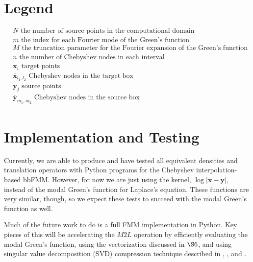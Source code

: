 \documentclass[11pt, oneside]{article}   	%
\begin{document}
\begin{appendices}
\section{Legend}
\begin{align*}
&N \mbox{ the number of source points in the computational domain}\\
&m \mbox{ the index for each Fourier mode of the Green's function}\\
&M \mbox{ the truncation parameter for the Fourier expansion of the Green's function}\\
&n \mbox{ the number of Chebyshev nodes in each interval}\\
&\mathbf{x}_i\mbox{ target points}\\
&\mathbf{\overline{x}}_{l_1,l_2}\mbox{ Chebyshev nodes in the target box}\\
&\mathbf{y}_j\mbox{ source points}\\
&\mathbf{\overline{y}}_{m_1,m_2}\mbox{ Chebyshev nodes in the source box}\\
\end{align*}


\section{Implementation and Testing}
Currently, we are able to produce and have tested all equivalent densities and translation operators with Python programs for the Chebyshev interpolation-based bbFMM. However, for now we are just using the kernel, $\log|\mathbf{x}-\mathbf{y}|$, instead of the modal Green's function for Laplace's equation. These functions are very similar, though, so we expect these tests to succeed with the modal Green's function as well.

Much of the future work to do is a full FMM implementation in Python. Key pieces of this will be accelerating the $M2L$ operation by efficiently evaluating the modal Green's function, using the vectorization discussed in $\S6$, and using singular value decomposition (SVD) compression technique described in \cite{CGMR}, \cite{FD}, \cite{ZGR} and \cite{MV}.


\end{appendices}
\end{document}
